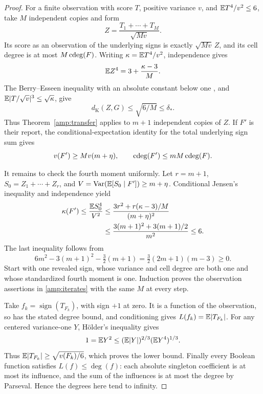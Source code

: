 \begin{proof}
For a finite observation with score $T$, positive variance $v$, and
$\mathbb E T^4/v^2\le6$, take $M$ independent copies and form
\[
 Z=\frac{T_1+\cdots+T_M}{\sqrt{Mv}}.
\]
Its score as an observation of the underlying signs is exactly
$\sqrt{Mv}\,Z$, and its cell degree is at most $M\operatorname{cdeg}(F)$.
Writing $\kappa=\mathbb E T^4/v^2$, independence gives
\begin{equation}
 \mathbb E Z^4=3+\frac{\kappa-3}{M}.
 \label{amp:average-fourth}
\end{equation}
The Berry--Esseen inequality with an absolute constant below one
\cite{Shevtsova2011}, and
$\mathbb E|T/\sqrt v|^3\le\sqrt\kappa$, give
\begin{equation}
 d_{\mathrm K}(Z,G)\le\sqrt{6/M}\le\delta_*.
 \label{amp:BE}
\end{equation}
Thus Theorem~\ref{amp:transfer} applies to $m+1$ independent copies
of $Z$.  If $F'$ is their report, the conditional-expectation identity
for the total underlying sign sum gives
\[
 v(F')\ge Mv(m+\eta),\qquad \operatorname{cdeg}(F')\le mM\operatorname{cdeg}(F).
\]

It remains to check the fourth moment uniformly.  Let $r=m+1$,
$S_0=Z_1+\cdots+Z_r$, and
$V=\operatorname{Var}(\mathbb E[S_0\mid F'])\ge m+\eta$.  Conditional Jensen's
inequality and independence yield
\begin{align}
 \kappa(F')\le\frac{\mathbb E S_0^4}{V^2}
 &\le\frac{3r^2+r(\kappa-3)/M}{(m+\eta)^2}\notag\\
 &\le\frac{3(m+1)^2+3(m+1)/2}{m^2}\le6.
 \label{amp:moment-invariant}
\end{align}
The last inequality follows from
\[
 6m^2-3(m+1)^2-\tfrac32(m+1)
 =\tfrac32(2m+1)(m-3)\ge0.
\]
Start with one revealed sign, whose variance and cell degree are both
one and whose standardized fourth moment is one.  Induction proves
the observation assertions in \eqref{amp:iterates} with the same $M$
at every step.

Take $f_k=\operatorname{sign}(T_{F_k})$, with sign $+1$ at zero.
It is a function of the observation, so has the stated degree bound,
and conditioning gives $L(f_k)=\mathbb E|T_{F_k}|$.
For any centered variance-one $Y$, H\"older's inequality gives
\[
 1=\mathbb E Y^2\le(\mathbb E|Y|)^{2/3}(\mathbb E Y^4)^{1/3}.
\]
Thus $\mathbb E|T_{F_k}|\ge\sqrt{v(F_k)/6}$, which proves the lower
bound.  Finally every Boolean function satisfies $L(f)\le\deg(f)$:
each absolute singleton coefficient is at most its influence, and the
sum of the influences is at most the degree by Parseval.  Hence the
degrees here tend to infinity.
\end{proof}


